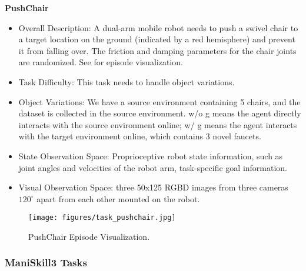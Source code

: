 \textbf{PushChair}
\begin{itemize}
    \item Overall Description: A dual-arm mobile robot needs to push a swivel chair to a target location on the ground (indicated by a red hemisphere) and prevent it from falling over. The friction and damping parameters for the chair joints are randomized. See  for episode visualization.
    \item Task Difficulty: This task needs to handle object variations.
    \item Object Variations: We have a source environment containing 5 chairs, and the dataset is collected in the source environment. w/o g means the agent directly interacts with the source environment online; w/ g means the agent interacts with the target environment online, which contains 3 novel faucets.
    \item State Observation Space: Proprioceptive robot state information, such as joint angles and velocities of the robot arm, task-specific goal information.
    \item Visual Observation Space: three 50x125 RGBD images from three cameras $120^\circ$ apart from each other mounted on the robot.
\end{itemize}
\begin{figure}[!ht]
    \centering
    \texttt{[image: figures/task\_pushchair.jpg]}
    \caption{PushChair Episode Visualization.}
    \label{fig:task_pushchair}
\end{figure}

\subsubsection{ManiSkill3 Tasks}

